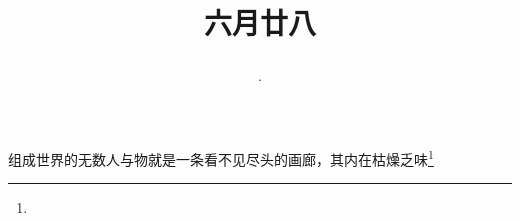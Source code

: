 \title{\date[d=2,m=8,y=2024][year:cn-y,年,month:cn,day:cn,日,·,weekday]·六月廿八 }
组成世界的无数人与物就是一条看不见尽头的画廊，其内在枯燥乏味\footnote{ }

